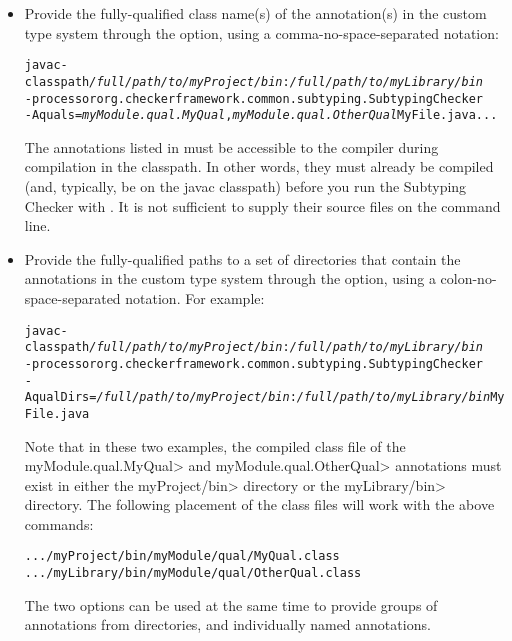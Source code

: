\begin{itemize}

\item
Provide the fully-qualified class name(s) of the annotation(s) in the custom
type system through the  option, using a comma-no-space-separated
notation:

\begin{alltt}
  javac -classpath \textit{/full/path/to/myProject/bin}:\textit{/full/path/to/myLibrary/bin} \ttbs
        -processor org.checkerframework.common.subtyping.SubtypingChecker \ttbs
        -Aquals=\textit{myModule.qual.MyQual},\textit{myModule.qual.OtherQual} MyFile.java ...
\end{alltt}

The annotations listed in  must be accessible to
the compiler during compilation in the classpath.  In other words, they must
already be compiled (and, typically, be on the javac classpath)
before you run the Subtyping Checker with .  It
is not sufficient to supply their source files on the command line.

\item
Provide the fully-qualified paths to a set of directories that contain the
annotations in the custom type system through the  option,
using a colon-no-space-separated notation. For example:

\begin{alltt}
  javac -classpath \textit{/full/path/to/myProject/bin}:\textit{/full/path/to/myLibrary/bin} \ttbs
        -processor org.checkerframework.common.subtyping.SubtypingChecker \ttbs
        -AqualDirs=\textit{/full/path/to/myProject/bin}:\textit{/full/path/to/myLibrary/bin} MyFile.java
\end{alltt}

Note that in these two examples, the compiled class file of the
\<myModule.qual.MyQual> and \<myModule.qual.OtherQual> annotations must exist
in either the \<myProject/bin> directory or the \<myLibrary/bin> directory. The
following placement of the class files will work with the above commands:

\begin{alltt}
  .../myProject/bin/myModule/qual/MyQual.class
  .../myLibrary/bin/myModule/qual/OtherQual.class
\end{alltt}

The two options can be used at the same time to provide groups of annotations
from directories, and individually named annotations.

\end{itemize}

